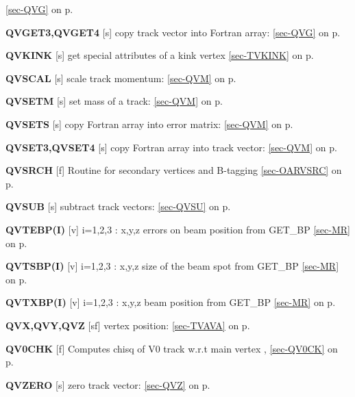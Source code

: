  \ref{sec-QVG} on p.~\pageref{sec-QVG}\\
 \item{\bf QVGET3,QVGET4   }[s] copy track vector into Fortran array:
 \ref{sec-QVG} on p.~\pageref{sec-QVG}\\
 \item{\bf QVKINK  }[s] get special attributes of a kink vertex \ref{sec-TVKINK} on p.~\pageref{sec-TVKINK}\\
 \item{\bf QVSCAL  }[s] scale track momentum: \ref{sec-QVM} on p.~\pageref{sec-QVM}\\
 \item{\bf QVSETM  }[s] set mass of a track: \ref{sec-QVM} on p.~\pageref{sec-QVM}\\
 \item{\bf QVSETS  }[s] copy Fortran array into error matrix:
 \ref{sec-QVM} on p.~\pageref{sec-QVM}\\
 \item{\bf QVSET3,QVSET4   }[s] copy Fortran array into track vector:
 \ref{sec-QVM} on p.~\pageref{sec-QVM}\\
 \item{\bf QVSRCH  }[f] Routine for secondary vertices and B-tagging
 \ref{sec-OARVSRC} on p.~\pageref{sec-OARVSRC}\\
 \item{\bf QVSUB   }[s] subtract track vectors: \ref{sec-QVSU} on p.~\pageref{sec-QVSU}\\
 \item{\bf QVTEBP(I) }[v] i=1,2,3 : x,y,z errors on beam position from GET\_BP
 \ref{sec-MR} on p.~\pageref{sec-MR}\\
 \item{\bf QVTSBP(I) }[v] i=1,2,3 : x,y,z size of the beam spot from GET\_BP
 \ref{sec-MR} on p.~\pageref{sec-MR}\\
 \item{\bf QVTXBP(I) }[v] i=1,2,3 : x,y,z beam position from GET\_BP
 \ref{sec-MR} on p.~\pageref{sec-MR}\\
 \item{\bf QVX,QVY,QVZ }[sf] vertex position: \ref{sec-TVAVA} on p.~\pageref{sec-TVAVA}\\
 \item{\bf QV0CHK  }[f] Computes chisq of V0 track w.r.t main vertex ,
 \ref{sec-QV0CK} on p.~\pageref{sec-QV0CK}\\
 \item{\bf QVZERO  }[s] zero track vector: \ref{sec-QVZ} on p.~\pageref{sec-QVZ} \\
